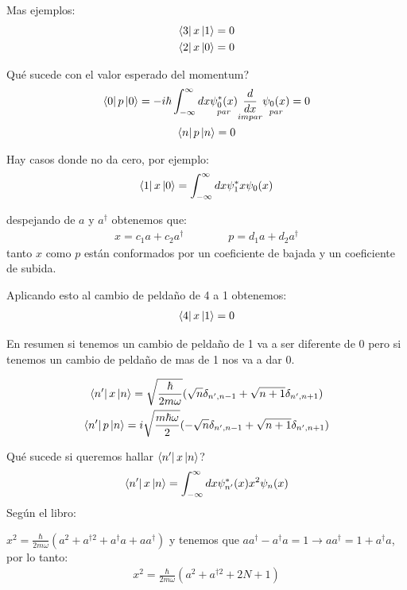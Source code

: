 \documentclass{article}
\newcommand{\caja}[3]{%
  \begin{tcolorbox}[colback=#1!5!white,colframe=#1!25!black,title=#2]
    #3
  \end{tcolorbox}%
}
\begin{document}
Mas ejemplos: 
\begin{gather*}
  \bra{3 }x \ket{1 } = 0\\
  \bra{2 }x \ket{0 } = 0  
\end{gather*}

Qué sucede con el valor esperado del momentum? 
\begin{gather*}
  \bra{0 }p \ket{0 } = - i \hbar \int_{-\infty}^{\infty} dx \underset{par }{\psi_0^*(x) }\underset{impar }{\frac{d  }{d x }  } \underset{par }{\psi_0 (x) } = 0 \\
  \bra{n }p \ket{n } = 0  
\end{gather*}

Hay casos donde no da cero, por ejemplo: 
\begin{gather*}
  \bra{1 }x \ket{0 } = \int_{-\infty}^{\infty} dx \psi_1^* x \psi_0(x)
\end{gather*}

despejando de $ a  $ y $ a ^ {\dag } $ obtenemos que: 
\begin{gather*}
  x = c_1 a + c_2 a ^ {\dag } \qquad \qquad p = d_1 a + d_2 a ^ {\dag }
\end{gather*}
tanto $ x  $ como $ p  $ están conformados por un coeficiente de bajada y un coeficiente de subida.

\hfill

Aplicando esto al cambio de peldaño de 4 a 1 obtenemos:
\begin{gather*}
  \bra{4 }x \ket{1 } = 0   
\end{gather*}

En resumen si tenemos un cambio de peldaño de 1 va a ser diferente de 0 pero si tenemos un cambio de peldaño de mas de 1 nos va a dar 0.

\caja{red}{}{
  \begin{gather*}
    \bra{n ' }x \ket{n } = \sqrt{\frac{\hbar }{2m \omega }}  (\sqrt{n } \delta _{n ', n-1 } + \sqrt{n + 1 } \delta _{n ' , n + 1 } )  \\
    \bra{n ' }p \ket{n } = i \sqrt{\frac{m \hbar  \omega }{2}} (- \sqrt{n } \delta _{n ' , n-1 } + \sqrt{n + 1 } \delta _{n ' , n + 1 } ) 
  \end{gather*}
}

Qué sucede si queremos hallar $ \bra{n' }x \ket{n }  $?
\begin{gather*}
  \bra{n'}x \ket{n } = \int_{- \infty}^{\infty} dx \psi _{n' } ^ {* }(x) x ^2 \psi_n (x)   
\end{gather*}
Según el libro: 
\caja{red}{}{
  $ x ^2 = \frac{\hbar }{2m \omega} (a ^2 + a ^ {\dag 2 } + a ^ {\dag } a + a a ^ {\dag}) $ y tenemos que $ a a ^ {\dag } - a ^ {\dag }a = 1 \rightarrow a a ^ {\dag } = 1 + a ^ {\dag }a  $, por lo tanto: 
  \begin{gather*}
    x ^2 = \frac{\hbar }{2m \omega} (a ^2 + a ^ {\dag 2 } + 2N +1)
  \end{gather*}
}
\end{document}
